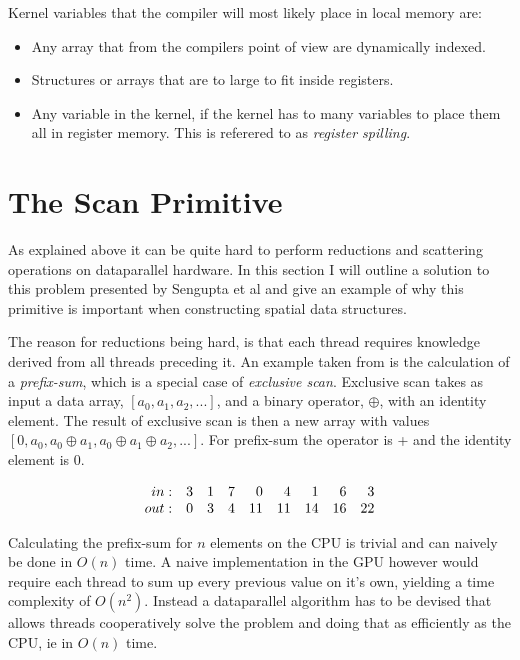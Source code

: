 Kernel variables that the compiler will most likely place in local
memory are:

\begin{itemize}
  \item Any array that from the compilers point of view are
    dynamically indexed.
  \item Structures or arrays that are to large to fit inside registers.
  \item Any variable in the kernel, if the kernel has to many
    variables to place them all in register memory. This is referered
    to as \textit{register spilling}.
\end{itemize}



\section{The Scan Primitive}\label{sec:GPUprims}


As explained above it can be quite hard to perform reductions and
scattering operations on dataparallel hardware. In this section I will
outline a solution to this problem presented by Sengupta et
al and give an example of why this primitive
is important when constructing spatial data structures.


The reason for reductions being hard, is that each thread requires
knowledge derived from all threads preceding it. An example taken from
 is the calculation of a \textit{prefix-sum},
which is a special case of \textit{exclusive scan}. Exclusive scan
takes as input a data array, $[a_0, a_1, a_2, ...]$, and a binary
operator, $\oplus$, with an identity element. The result of exclusive
scan is then a new array with values $[0, a_0, a_0 \oplus a_1, a_0
  \oplus a_1 \oplus a_2, ...]$. For prefix-sum the operator is + and
the identity element is 0.

\begin{displaymath}
  \begin{array}{r r r r r r r r r}
    in: & 3 & 1 & 7 & 0 & 4 & 1 & 6 & 3 \\
    out: & 0 & 3 & 4 & 11 & 11 & 14 & 16 & 22 \\
  \end{array}
\end{displaymath}

Calculating the prefix-sum for $n$ elements on the CPU is trivial and
can naively be done in $O(n)$ time. A naive implementation in the GPU
however would require each thread to sum up every previous value on
it's own, yielding a time complexity of $O(n^2)$. Instead a
dataparallel algorithm has to be devised that allows threads
cooperatively solve the problem and doing that as efficiently as the
CPU, ie in $O(n)$ time.


